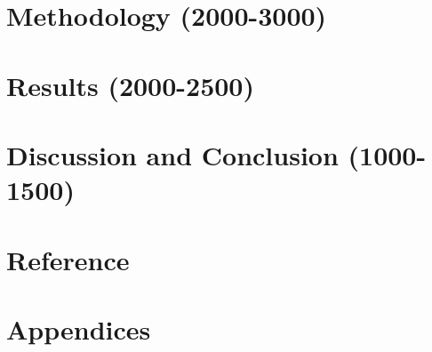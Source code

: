 \documentclass[
  11pt,
]{article}
\begin{document}
\hypertarget{methodology-2000-3000}{%
\section{Methodology (2000-3000)}\label{methodology-2000-3000}}

\hypertarget{results-2000-2500}{%
\section{Results (2000-2500)}\label{results-2000-2500}}

\hypertarget{discussion-and-conclusion-1000-1500}{%
\section{Discussion and Conclusion
(1000-1500)}\label{discussion-and-conclusion-1000-1500}}

\hypertarget{reference}{%
\section{Reference}\label{reference}}

\hypertarget{appendices}{%
\section{Appendices}\label{appendices}}
\end{document}
